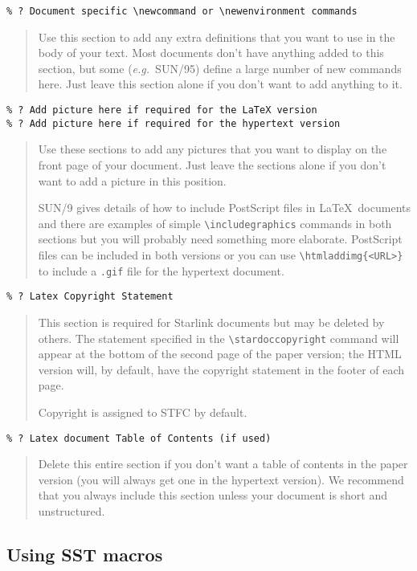 \documentclass[twoside,11pt]{article}
\newcommand{\stardoccopyright} 
{Copyright \copyright\ 2000-2004 Council for the Central Laboratory of the
Research Councils \newline\
Copyright \copyright\ 2008-2009 Science and Technology Facilities Council}
\newcommand{\htmladdimg}[1]{}
\newcommand{\xref}[3]{#1}
\newcommand{\xlabel}[1]{}
\renewcommand{\_}{\texttt{\symbol{95}}}
\begin{document}
\verb+% ? Document specific \newcommand or \newenvironment commands+

\begin{quote}
Use this section to add any extra definitions that you want to use in the body
of your text.
Most documents don't have anything added to this section, but some
({\em{e.g.}}\ SUN/95) define a large number of new commands here.
Just leave this section alone if you don't want to add anything to it.
\end{quote}
\begin{verbatim}
% ? Add picture here if required for the LaTeX version
% ? Add picture here if required for the hypertext version
\end{verbatim}
\begin{quote}
Use these sections to add any pictures that you want to display on the front
page of your document.
Just leave the sections alone if you don't want to add a picture in this
position.

\xref{SUN/9}{sun9}{including_ps_in_latex}
gives details of how to include PostScript files in \LaTeX\ documents
and there are examples of simple \verb+\includegraphics+ commands in both
sections but you will probably need something more elaborate.
PostScript files can be included in both versions
or you can use \verb+\htmladdimg{<URL>}+ to include a \texttt{.gif} file for
the hypertext document.
\end{quote}

\verb+% ? Latex Copyright Statement+

\begin{quote}
This section is required for Starlink documents but may be deleted by others.
The statement specified in the \verb+\stardoccopyright+ command will appear at
the bottom of the second page of the paper version; the HTML version will, by
default, have the copyright statement in the footer of each page.

Copyright is assigned to STFC by default.
\end{quote}

\verb+% ? Latex document Table of Contents (if used)+

\begin{quote}
Delete this entire section if you don't want a table of contents in the paper
version (you will always get one in the hypertext version).
We recommend that you always include this section unless your document is short
and unstructured.
\end{quote}

\subsection{\xlabel{using_sst_macros}Using SST macros}
\end{document}
